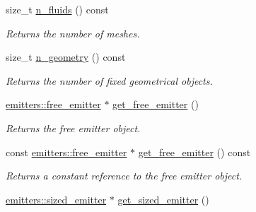 \begin{DoxyCompactItemize}
\mbox{\label{classphysim_1_1simulator_a09f70976676691fac655a7c4c5efba96}} 
size\+\_\+t \hyperlink{classphysim_1_1simulator_a09f70976676691fac655a7c4c5efba96}{n\+\_\+fluids} () const
\begin{DoxyCompactList}\small\item\em Returns the number of meshes. \end{DoxyCompactList}\item 
\mbox{\label{classphysim_1_1simulator_a77da641e3bba577bbbfe67a8bcfcbe26}} 
size\+\_\+t \hyperlink{classphysim_1_1simulator_a77da641e3bba577bbbfe67a8bcfcbe26}{n\+\_\+geometry} () const
\begin{DoxyCompactList}\small\item\em Returns the number of fixed geometrical objects. \end{DoxyCompactList}\item 
\mbox{\label{classphysim_1_1simulator_a038e443c30bb788124f4c223f1dc6b2b}} 
\hyperlink{classphysim_1_1emitters_1_1free__emitter}{emitters\+::free\+\_\+emitter} $\ast$ \hyperlink{classphysim_1_1simulator_a038e443c30bb788124f4c223f1dc6b2b}{get\+\_\+free\+\_\+emitter} ()
\begin{DoxyCompactList}\small\item\em Returns the free emitter object. \end{DoxyCompactList}\item 
\mbox{\label{classphysim_1_1simulator_a48a574582fa0d04712f222456d79e834}} 
const \hyperlink{classphysim_1_1emitters_1_1free__emitter}{emitters\+::free\+\_\+emitter} $\ast$ \hyperlink{classphysim_1_1simulator_a48a574582fa0d04712f222456d79e834}{get\+\_\+free\+\_\+emitter} () const
\begin{DoxyCompactList}\small\item\em Returns a constant reference to the free emitter object. \end{DoxyCompactList}\item 
\mbox{\label{classphysim_1_1simulator_a4eb508e0264771e4e61d37eca4aa45a1}} 
\hyperlink{classphysim_1_1emitters_1_1sized__emitter}{emitters\+::sized\+\_\+emitter} $\ast$ \hyperlink{classphysim_1_1simulator_a4eb508e0264771e4e61d37eca4aa45a1}{get\+\_\+sized\+\_\+emitter} ()

\end{DoxyCompactItemize}
